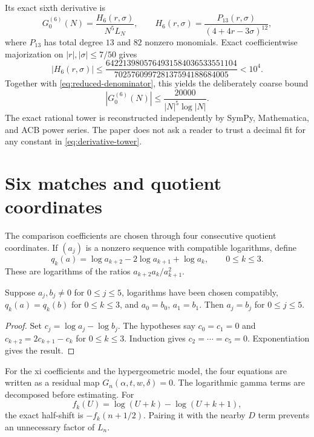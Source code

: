 \documentclass[12pt]{article}
\begin{document}
Its exact sixth derivative is
\begin{equation}\label{eq:H6-form}
 G_0^{(6)}(N)=\frac{H_6(r,\sigma)}{N^5L_N},
 \qquad
 H_6(r,\sigma)=\frac{P_{13}(r,\sigma)}{(4+4r-3\sigma)^{12}},
\end{equation}
where $P_{13}$ has total degree $13$ and $82$ nonzero monomials.  Exact
coefficientwise majorization on $|r|,|\sigma|\le7/50$ gives
\begin{equation}\label{eq:H6-majorant}
 |H_6(r,\sigma)|\le
 \frac{6422139805764931584036533551104}
 {702576099728137594188684005}<10^4.
\end{equation}
Together with \eqref{eq:reduced-denominator}, this yields the deliberately
coarse bound
\begin{equation}\label{eq:h6-bound}
 |G_0^{(6)}(N)|\le\frac{20000}{|N|^5\log|N|}.
\end{equation}
The exact rational tower is reconstructed independently by SymPy,
Mathematica, and ACB power series.  The paper does not ask a reader to trust
a decimal fit for any constant in \eqref{eq:derivative-tower}.

\section{Six matches and quotient coordinates}\label{sec:matches}

The comparison coefficients are chosen through four consecutive quotient
coordinates.  If $(a_j)$ is a nonzero sequence with compatible logarithms,
define
\begin{equation}\label{eq:quotient-coordinate}
 q_k(a)=\log a_{k+2}-2\log a_{k+1}+\log a_k,
 \qquad 0\le k\le3.
\end{equation}
These are logarithms of the ratios
$a_{k+2}a_k/a_{k+1}^2$.

\begin{lemma}\label{lem:sixmatch}
Suppose $a_j,b_j\ne0$ for $0\le j\le5$, logarithms have been chosen
compatibly, $q_k(a)=q_k(b)$ for $0\le k\le3$, and
$a_0=b_0$, $a_1=b_1$.  Then $a_j=b_j$ for $0\le j\le5$.
\end{lemma}

\begin{proof}
Set $c_j=\log a_j-\log b_j$.  The hypotheses say $c_0=c_1=0$ and
$c_{k+2}=2c_{k+1}-c_k$ for $0\le k\le3$.  Induction gives
$c_2=\cdots=c_5=0$.  Exponentiation gives the result.
\end{proof}

For the xi coefficients and the hypergeometric model, the four equations are
written as a residual map $G_n(\alpha,t,w,\delta)=0$.  The logarithmic gamma
terms are decomposed before estimating.  For
\[
 f_k(U)=\log(U+k)-\log(U+k+1),
\]
the exact half-shift is $-f_k(n+1/2)$.  Pairing it with the nearby $D$ term
prevents an unnecessary factor of $L_n$.
\end{document}
